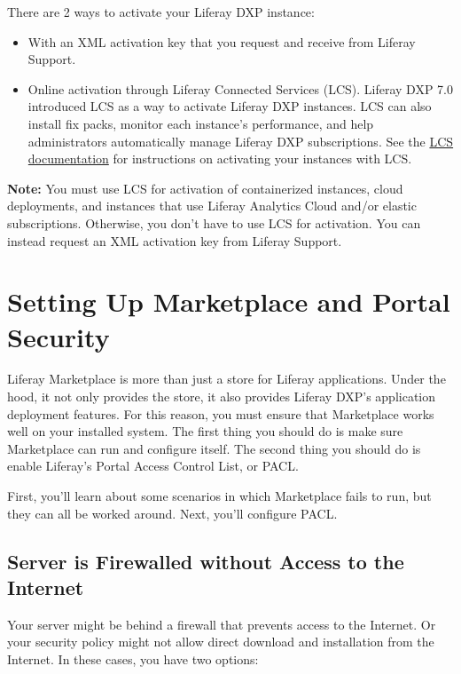 There are 2 ways to activate your Liferay DXP instance:

\begin{itemize}
\item
  With an XML activation key that you request and receive from Liferay
  Support.
\item
  Online activation through Liferay Connected Services (LCS). Liferay
  DXP 7.0 introduced LCS as a way to activate Liferay DXP instances. LCS
  can also install fix packs, monitor each instance's performance, and
  help administrators automatically manage Liferay DXP subscriptions.
  See the
  \href{/docs/7-0/deploy/-/knowledge_base/d/managing-liferay-with-liferay-connected-services}{LCS
  documentation} for instructions on activating your instances with LCS.
\end{itemize}

\noindent\hrulefill

\textbf{Note:} You must use LCS for activation of containerized
instances, cloud deployments, and instances that use Liferay Analytics
Cloud and/or elastic subscriptions. Otherwise, you don't have to use LCS
for activation. You can instead request an XML activation key from
Liferay Support.

\section{Setting Up Marketplace and Portal
Security}\label{setting-up-marketplace-and-portal-security}

Liferay Marketplace is more than just a store for Liferay applications.
Under the hood, it not only provides the store, it also provides Liferay
DXP's application deployment features. For this reason, you must ensure
that Marketplace works well on your installed system. The first thing
you should do is make sure Marketplace can run and configure itself. The
second thing you should do is enable Liferay's Portal Access Control
List, or PACL.

First, you'll learn about some scenarios in which Marketplace fails to
run, but they can all be worked around. Next, you'll configure PACL.

\subsection{Server is Firewalled without Access to the
Internet}\label{server-is-firewalled-without-access-to-the-internet}

Your server might be behind a firewall that prevents access to the
Internet. Or your security policy might not allow direct download and
installation from the Internet. In these cases, you have two options:

